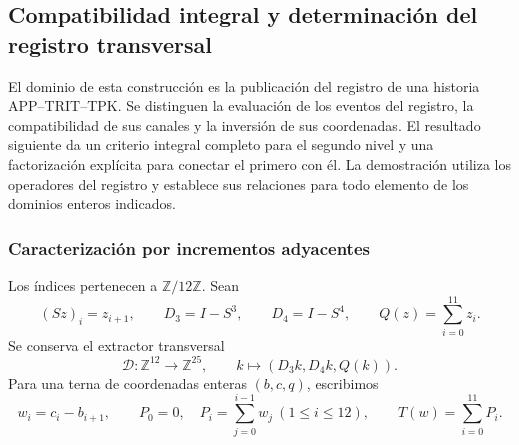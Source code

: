\subsection{Compatibilidad integral y determinación del registro transversal}
\label{img09:seccion}

El dominio de esta construcción es la publicación del registro de una
historia APP--TRIT--TPK. Se distinguen la evaluación de los eventos del
registro, la compatibilidad de sus canales y la inversión de sus
coordenadas. El resultado siguiente da un criterio integral completo para
el segundo nivel y una factorización explícita para conectar el primero con él.
La demostración utiliza los operadores del registro y establece sus
relaciones para todo elemento de los dominios enteros indicados.

\subsubsection{Caracterización por incrementos adyacentes}

Los índices pertenecen a $\mathbb Z/12\mathbb Z$. Sean
\[
 (Sz)_i=z_{i+1},\qquad D_3=I-S^3,\qquad D_4=I-S^4,
 \qquad Q(z)=\sum_{i=0}^{11}z_i.
\]
Se conserva el extractor transversal
\[
 \mathcal D:\mathbb Z^{12}\longrightarrow\mathbb Z^{25},
 \qquad k\longmapsto(D_3k,D_4k,Q(k)).
\]
Para una terna de coordenadas enteras $(b,c,q)$, escribimos
\begin{equation}
 w_i=c_i-b_{i+1},\qquad
 P_0=0,\quad P_i=\sum_{j=0}^{i-1}w_j\ (1\leq i\leq12),
 \qquad T(w)=\sum_{i=0}^{11}P_i.
 \label{img09:incremento}
\end{equation}

